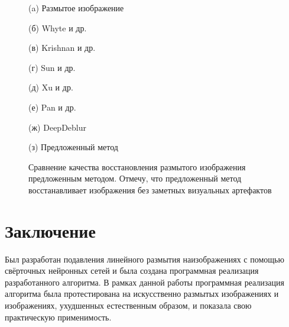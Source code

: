 \begin{figure}[H]
\begin{minipage}[t]{0.22\linewidth}
(a) Размытое изображение\\ 
\end{minipage}
\hfill
\begin{minipage}[t]{0.22\linewidth}
(б) Whyte и др.\\ 
\end{minipage}
\hfill
\begin{minipage}[t]{0.22\linewidth}
(в) Krishnan и др.\\ 
\end{minipage}
\hfill
\begin{minipage}[t]{0.22\linewidth}
(г) Sun и др.\\ 
\end{minipage}
    \vfill
\begin{minipage}[t]{0.22\linewidth}
(д) Xu и др.\\ 
\end{minipage}
\hfill
\begin{minipage}[t]{0.22\linewidth}
(е) Pan и др.\\
\end{minipage}
\hfill
\begin{minipage}[t]{0.22\linewidth}
(ж) DeepDeblur\\
\end{minipage}
\hfill
\begin{minipage}[t]{0.22\linewidth}
(з) Предложенный метод\\
\end{minipage}

\caption{Сравнение качества восстановления размытого изображения предложенным методом. Отмечу, что предложенный метод восстанавливает изображения без заметных визуальных артефактов}
\label{ris:restore_example_big}
\end{figure}

\newpage
\section{Заключение}
Был разработан подавления линейного размытия наизображениях с помощью свёрточных нейронных сетей и была создана программная реализация разработанного алгоритма.
В рамках данной работы программная реализация алгоритма была протестирована
на искусственно размытых изображениях и изображениях, ухудшенных естественным образом, и показала свою практическую применимость.


\newpage
\printbibliography[heading=bibintoc]

